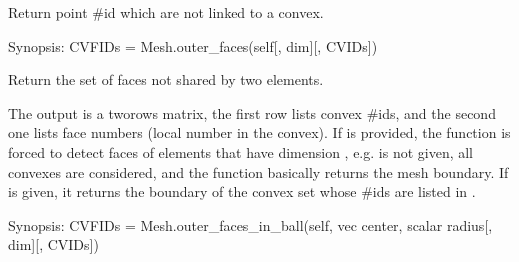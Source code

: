 \documentclass[a4paper,11pt,english]{sphinxmanual}
\begin{document}
\begin{fulllineitems}

\begin{fulllineitems}
\label{\detokenize{python/cmdref_Mesh:getfem.Mesh.orphaned_pid}}
Return point \#id which are not linked to a convex.

\end{fulllineitems}


\begin{fulllineitems}
\label{\detokenize{python/cmdref_Mesh:getfem.Mesh.outer_faces}}
Synopsis: CVFIDs = Mesh.outer\_faces(self{[}, dim{]}{[}, CVIDs{]})

Return the set of faces not shared by two elements.

The output  is a two\sphinxhyphen{}rows matrix, the first row lists
convex \#ids, and the second one lists face numbers (local number
in the convex). If  is provided, the function is forced to
detect faces of elements that have dimension , e.g.  is not given, all convexes are considered, and the
function basically returns the mesh boundary. If 
is given, it returns the boundary of the convex set whose \#ids are
listed in .

\end{fulllineitems}


\begin{fulllineitems}
\label{\detokenize{python/cmdref_Mesh:getfem.Mesh.outer_faces_in_ball}}
Synopsis: CVFIDs = Mesh.outer\_faces\_in\_ball(self, vec center, scalar radius{[}, dim{]}{[}, CVIDs{]})


\end{fulllineitems}
\end{fulllineitems}
\end{document}
